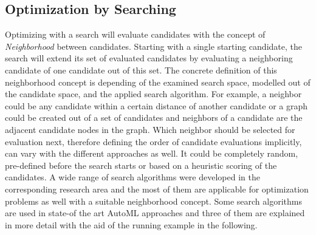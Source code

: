 \subsection{Optimization by Searching}
\label{sec:theory:optimization:search}
Optimizing with a search will evaluate candidates with the concept of \textit{Neighborhood} between candidates.
Starting with a single starting candidate, the search will extend its set of evaluated candidates by evaluating a neighboring candidate of one candidate out of this set.
The concrete definition of this neighborhood concept is depending of the examined search space, modelled out of the candidate space, and the applied search algorithm.
For example, a neighbor could be any candidate within a certain distance of another candidate or a graph could be created out of a set of candidates and neighbors of a candidate are the adjacent candidate nodes in the graph.
Which neighbor should be selected for evaluation next, therefore defining the order of candidate evaluations implicitly, can vary with the different approaches as well.
It could be completely random, pre-defined before the search starts or based on a heuristic scoring of the candidates.\newline
A wide range of search algorithms were developed in the corresponding research area and the most of them are applicable for optimization problems as well with a suitable neighborhood concept.
Some search algorithms are used in state-of the art AutoML approaches and three of them are explained in more detail with the aid of the running example in the following.


